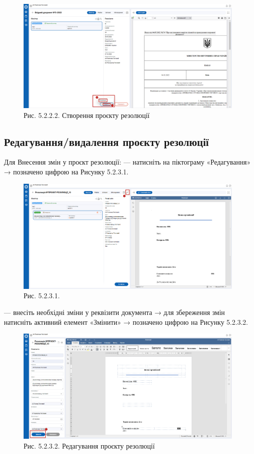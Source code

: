 \begin{figure}[!htbp]
\centerline{\includegraphics[width=\textwidth]{img/5.2.2.1.png}}
\caption{Рис. 5.2.2.2. Створення проєкту резолюції}
\end{figure}

\subsection{Редагування/видалення проєкту резолюції}

Для Внесення змін у проєкт резолюції:
--- натисніть на піктограму «Редагування» → позначено цифрою  на Рисунку 5.2.3.1.

\begin{figure}[!htbp]
\centerline{\includegraphics[width=\textwidth]{img/5.2.3.1.png}}
\caption{Рис. 5.2.3.1.}
\end{figure}

--- внесіть необхідні зміни у реквізити документа → для збереження змін
натисніть активний елемент «Змінити» → позначено цифрою  на Рисунку 5.2.3.2.

\begin{figure}[!htbp]
\centerline{\includegraphics[width=\textwidth]{img/5.2.3.2.png}}
\caption{Рис. 5.2.3.2. Редагування проєкту резолюції}
\end{figure}

